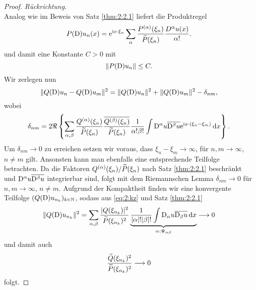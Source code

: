 \begin{proof} {\it Rückrichtung.}
\begin{equation}
\end{equation}
Analog wie im Beweis von Satz \ref{thm:2:2.1} liefert die Produktregel
\begin{equation}
P(\mathrm D)u_n(x)=\mathrm e^{\mathrm i x \cdot \xi_n}\sum_\alpha\frac{P^{(\alpha)}(\xi_n)}{\widetilde{P}(\xi_n)}\frac{D^\alpha u(x)}{\alpha!}.
\end{equation}
und damit eine Konstante $C>0$ mit
\begin{equation}\label{eq:2:PDunb}
\lVert P(\mathrm D)u_n\rVert\leq C.
\end{equation}
Wir zerlegen nun
\begin{equation}\label{eq:2:kz}
\lVert Q(\mathrm D)u_n-Q(\mathrm D)u_m\rVert^2=\lVert Q(\mathrm D)u_n\rVert^2+\lVert Q(\mathrm D)u_m\rVert^2-\delta_{nm},
\end{equation}
wobei
\begin{equation}
\delta_{nm}=2\Re\left\{\sum_{\alpha,\beta}\frac{Q^{(\alpha)}(\xi_n)}{\widetilde{P}(\xi_n)}\frac{\overline{Q^{(\beta)}(\xi_n)}}{\widetilde{P}(\xi_n)}
\frac1{\alpha!\beta!}\int \mathrm D^\alpha u\overline{\mathrm D^\beta u}\mathrm e^{\mathrm i x \cdot(\xi_n-\xi_m)}\,\mathrm d  x\right\}.
\end{equation}
Um $\delta_{nm}\to0$ zu erreichen setzen wir voraus, dass $\xi_n-\xi_m\to\infty$, für $n,m\to\infty$, $n\neq m$ gilt. Ansonsten kann man ebenfalls eine entsprechende Teilfolge betrachten.
Da die Faktoren $Q^{(\alpha)}(\xi_n)/\widetilde{P}(\xi_n)$ nach Satz \ref{thm:2:2.1} beschränkt und $\mathrm D^\alpha u\overline{\mathrm D^\beta u}$ integrierbar sind, folgt mit dem Riemannschen Lemma $\delta_{nm}\to0$ für $n,m\to\infty$, $n\neq m$.
Aufgrund der Kompaktheit finden wir eine konvergente Teilfolge $(Q(\mathrm D)u_{n_k})_{k \in \mathbb{N}}$, sodass aus \eqref{eq:2:kz} und Satz \ref{thm:2:2.1}
\begin{equation}
\lVert Q(\mathrm D)u_{n_k}\rVert^2=\sum_{\alpha,\beta}\frac{\lvert Q(\xi_{n_k})\rvert^2}{\widetilde{P}(\xi_{n_k})^2} \underbrace{\frac{1}{|\alpha|! |\beta|!}\int \mathrm D_\alpha u \overline{\mathrm D_\beta u} \,\mathrm d x}_{=:\Psi_{\alpha \beta}} \longrightarrow 0
\end{equation}
und damit auch 
\begin{equation}
\frac{\widetilde{Q}(\xi_{n_k})^2}{\widetilde{P}(\xi_{n_k})^2} \longrightarrow 0
\end{equation}
folgt.
\end{proof}

